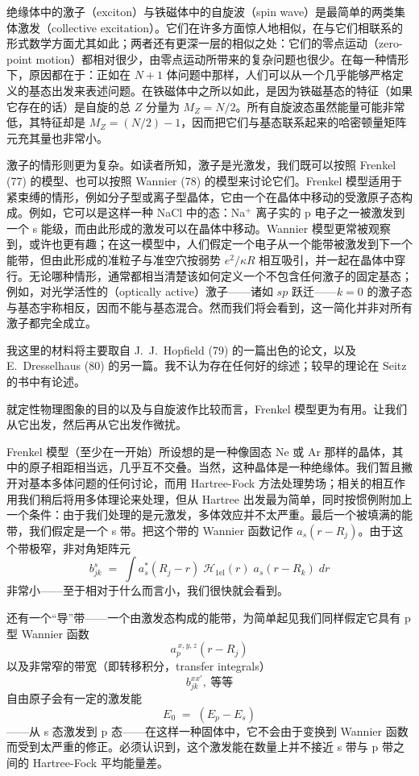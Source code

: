 绝缘体中的激子（exciton）与铁磁体中的自旋波（spin wave）是最简单的两类集体激发（collective excitation）。它们在许多方面惊人地相似，在与它们相联系的形式数学方面尤其如此；两者还有更深一层的相似之处：它们的零点运动（zero-point motion）都相对很少，由零点运动所带来的复杂问题也很少。在每一种情形下，原因都在于：正如在 $N+1$ 体问题中那样，人们可以从一个几乎能够严格定义的基态出发来表述问题。在铁磁体中之所以如此，是因为铁磁基态的特征（如果它存在的话）是自旋的总 $Z$ 分量为 $M_Z = N/2$。所有自旋波态虽然能量可能非常低，其特征却是 $M_Z = (N/2) - 1$，因而把它们与基态联系起来的哈密顿量矩阵元充其量也非常小。

激子的情形则更为复杂。如读者所知，激子是光激发，我们既可以按照 Frenkel (77) 的模型、也可以按照 Wannier (78) 的模型来讨论它们。Frenkel 模型适用于紧束缚的情形，例如分子型或离子型晶体，它由一个在晶体中移动的受激原子态构成。例如，它可以是这样一种 NaCl 中的态：Na$^+$ 离子实的 p 电子之一被激发到一个 s 能级，而由此形成的激发可以在晶体中移动。Wannier 模型更常被观察到，或许也更有趣；在这一模型中，人们假定一个电子从一个能带被激发到下一个能带，但由此形成的准粒子与准空穴按弱势 $e^2/\kappa R$ 相互吸引，并一起在晶体中穿行。无论哪种情形，通常都相当清楚该如何定义一个不包含任何激子的固定基态；例如，对光学活性的（optically active）激子——诸如 $sp$ 跃迁——$k=0$ 的激子态与基态宇称相反，因而不能与基态混合。然而我们将会看到，这一简化并非对所有激子都完全成立。

我这里的材料将主要取自 J.~J.~Hopfield (79) 的一篇出色的论文，以及 E.~Dresselhaus (80) 的另一篇。我不认为存在任何好的综述；较早的理论在 Seitz 的书中有论述。

就定性物理图象的目的以及与自旋波作比较而言，Frenkel 模型更为有用。让我们从它出发，然后再从它出发作微扰。

Frenkel 模型（至少在一开始）所设想的是一种像固态 Ne 或 Ar 那样的晶体，其中的原子相距相当远，几乎互不交叠。当然，这种晶体是一种绝缘体。我们暂且撇开对基本多体问题的任何讨论，而用 Hartree-Fock 方法处理势场；相关的相互作用我们稍后将用多体理论来处理，但从 Hartree 出发最为简单，同时按惯例附加上一个条件：由于我们处理的是元激发，多体效应并不太严重。最后一个被填满的能带，我们假定是一个 s 带。把这个带的 Wannier 函数记作 $a_s(r-R_j)$。由于这个带极窄，非对角矩阵元
\begin{equation*}
b_{jk}^{s} \;=\; \int a_s^{*}(R_j - r)\; \mathcal{H}_{1\mathrm{el}}(r)\; a_s(r - R_k)\; dr
\end{equation*}
非常小——至于相对于什么而言小，我们很快就会看到。

还有一个“导”带——一个由激发态构成的能带，为简单起见我们同样假定它具有 p 型 Wannier 函数
\begin{equation*}
a_p^{\,x,y,z}(r - R_j)
\end{equation*}
以及非常窄的带宽（即转移积分，transfer integrals）
\begin{equation*}
b_{jk}^{xx'},\ \text{等等}
\end{equation*}
自由原子会有一定的激发能
\begin{equation*}
E_0 \;=\; (E_p - E_s)
\end{equation*}
——从 s 态激发到 p 态——在这样一种固体中，它不会由于变换到 Wannier 函数而受到太严重的修正。必须认识到，这个激发能在数量上并不接近 s 带与 p 带之间的 Hartree-Fock 平均能量差。


